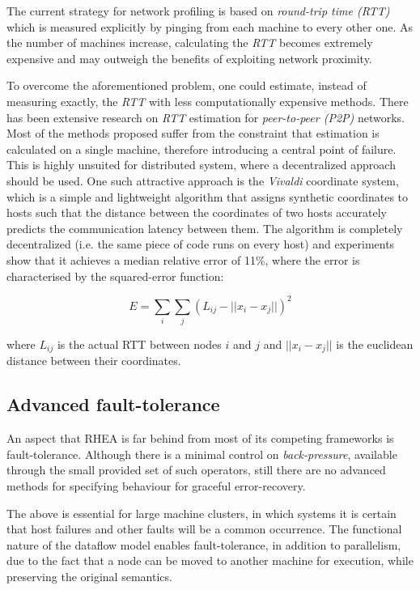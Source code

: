 \documentclass[sigplan,review,anonymous]{acmart}
\begin{document}
The current strategy for network profiling is based on \textit{round-trip time
(RTT)} which is measured explicitly by pinging from each machine to every other
one. As the number of machines increase, calculating the \textit{RTT} becomes
extremely expensive and may outweigh the benefits of exploiting network
proximity.

To overcome the aforementioned problem, one could estimate, instead of measuring
exactly, the \textit{RTT} with less computationally expensive methods. There has
been extensive research on \textit{RTT} estimation for \textit{peer-to-peer
(P2P)} networks\cite{rtt_survey}. Most of the methods proposed suffer from the
constraint that estimation is calculated on a single machine, therefore
introducing a central point of failure. This is highly unsuited for distributed
system, where a decentralized approach should be used. One such attractive
approach is the \textit{Vivaldi} coordinate system\cite{vivaldi}, which is a
simple and lightweight algorithm that assigns synthetic coordinates to hosts
such that the distance between the coordinates of two hosts accurately predicts
the communication latency between them. The algorithm is completely
decentralized (i.e. the same piece of code runs on every host) and experiments
show that it achieves a median relative error of 11\%, where the error is
characterised by the squared-error function:

\[ E =  \sum_i \sum_j (L_{ij}-||x_i - x_j||)^2  \]

where $L_{ij}$ is the actual RTT between nodes $i$ and $j$ and $||x_i - x_j||$
is the euclidean distance between their coordinates.

\subsection{Advanced fault-tolerance}

An aspect that \textsc{RHEA} is far behind from most of its competing frameworks
is fault-tolerance. Although there is a minimal control on
\textit{back-pressure},
available through the small provided set of such operators, still
there are no advanced methods for specifying behaviour for graceful
error-recovery.

The above is essential for large machine clusters, in which systems it is
certain that host failures and other faults will be a common occurrence. The
functional nature of the dataflow model enables fault-tolerance, in addition to
parallelism, due to the fact that a node can be moved to another machine for
execution, while preserving the original semantics.
\end{document}
